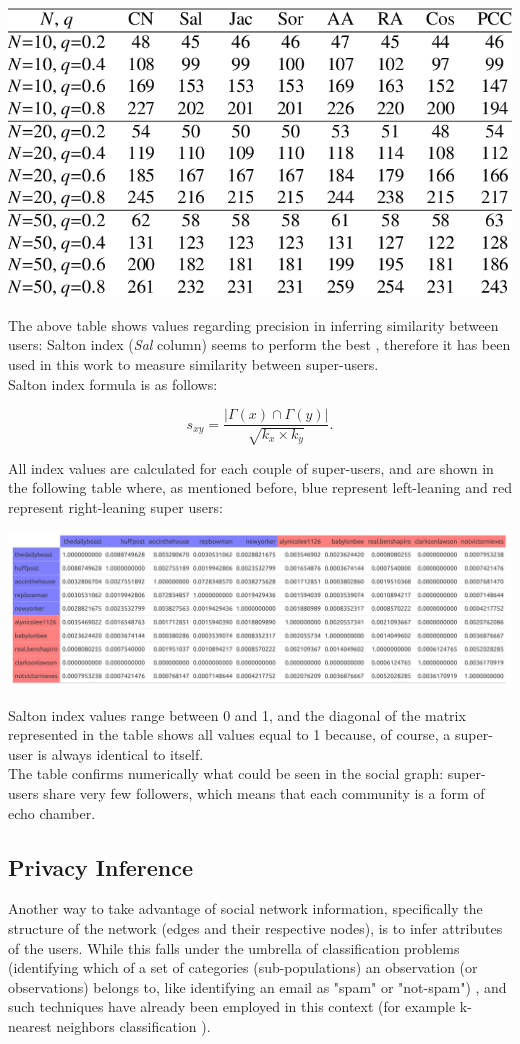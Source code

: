 \aCapo{}
\includegraphics[width = .5\textwidth]{images/salton_precision.png}

The above table shows values regarding precision in inferring similarity between users: Salton index (\textit{Sal} column) seems to perform the best \cite{10.1016/j.phpro.2010.07.033}, therefore it has been used in this work to measure similarity between super-users.\\
Salton index formula is as follows: 

$$s_{xy}=\frac{|\Gamma(x)\cap\Gamma(y)|}{\sqrt{k_x\times k_y}}.$$

All index values are calculated for each couple of super-users, and are shown in the following table where, as mentioned before, blue represent left-leaning and red represent right-leaning super users: 

\aCapo{}
\includegraphics[width = .5\textwidth]{images/final_salton_matrix.png}

Salton index values range between 0 and 1, and the diagonal of the matrix represented in the table shows all values equal to 1 because, of course, a super-user is always identical to itself.\\
The table confirms numerically what could be seen in the social graph: super-users share very few followers, which means that each community is a form of echo chamber.

\subsection{Privacy Inference}
Another way to take advantage of social network information, specifically the structure of the network (edges and their respective nodes), is to infer attributes of the users. While this falls under the umbrella of classification problems (identifying which of a set of categories (sub-populations) an observation (or observations) belongs to, like identifying an email as "spam" or "not-spam") \cite{wikiClassification}, and such techniques have already been employed in this context (for example k-nearest neighbors classification \cite{wikiKNN}).




